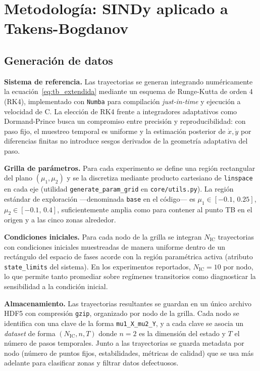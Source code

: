 \section{Metodología: SINDy aplicado a Takens-Bogdanov}
\label{3:sec:metodologia}

\subsection{Generación de datos}

\textbf{Sistema de referencia.} Las trayectorias se generan integrando numéricamente la ecuación~\eqref{eq:tb_extendida} mediante un esquema de Runge-Kutta de orden 4 (RK4), implementado con \texttt{Numba} para compilación \textit{just-in-time} y ejecución a velocidad de C. La elección de RK4 frente a integradores adaptativos como Dormand-Prince busca un compromiso entre precisión y reproducibilidad: con paso fijo, el muestreo temporal es uniforme y la estimación posterior de $\dot{x}, \dot{y}$ por diferencias finitas no introduce sesgos derivados de la geometría adaptativa del paso.

\textbf{Grilla de parámetros.} Para cada experimento se define una región rectangular del plano $(\mu_1, \mu_2)$ y se la discretiza mediante producto cartesiano de \texttt{linspace} en cada eje (utilidad \texttt{generate\_param\_grid} en \texttt{core/utils.py}). La región estándar de exploración —denominada \texttt{base} en el código— es $\mu_1 \in [-0.1,\, 0.25]$, $\mu_2 \in [-0.1,\, 0.4]$, suficientemente amplia como para contener al punto TB en el origen y a las cinco zonas alrededor.

\textbf{Condiciones iniciales.} Para cada nodo de la grilla se integran $N_{\text{IC}}$ trayectorias con condiciones iniciales muestreadas de manera uniforme dentro de un rectángulo del espacio de fases acorde con la región paramétrica activa (atributo \texttt{state\_limits} del sistema). En los experimentos reportados, $N_{\text{IC}} = 10$ por nodo, lo que permite tanto promediar sobre regímenes transitorios como diagnosticar la sensibilidad a la condición inicial.

\textbf{Almacenamiento.} Las trayectorias resultantes se guardan en un único archivo HDF5 con compresión \texttt{gzip}, organizado por nodo de la grilla. Cada nodo se identifica con una clave de la forma \texttt{mu1\_X\_mu2\_Y}, y a cada clave se asocia un \textit{dataset} de forma $(N_{\text{IC}}, n, T)$ donde $n=2$ es la dimensión del estado y $T$ el número de pasos temporales. Junto a las trayectorias se guarda metadata por nodo (número de puntos fijos, estabilidades, métricas de calidad) que se usa más adelante para clasificar zonas y filtrar datos defectuosos.

